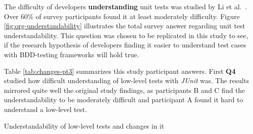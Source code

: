The difficulty of developers \textbf{understanding} unit tests was studied by Li et al.~\cite{li2016automatically}. Over 60\% of survey
participants found it at least moderately difficulty. Figure \ref{fig:org-understandability} illustrates the total survey
answer regarding unit test understandability. This question was chosen to be replicated in this study to see, if the research
hypothesis of developers finding it easier to understand test cases with BDD-testing frameworks will hold true.

Table \ref{tab:changes-pt3} summarizes this study participant answers. First \textbf{Q4} studied how difficult understanding
of low-level tests with \textit{JUnit} was. The results mirrored quite well the original study findings, as participants B and C
find the understandability to be moderately difficult and participant A found it hard to understand a low-level test.


    \begin{table}[H]
            \caption {Understandability of low-level tests and changes in it} \label{tab:changes-pt3}
    \end{table}

